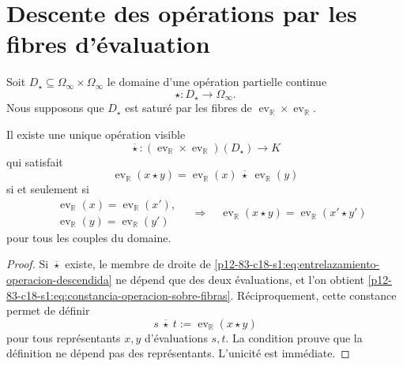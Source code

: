 \section{Descente des opérations par les fibres d'évaluation}

Soit \(D_\star\subseteq\Omega_\infty\times\Omega_\infty\) le domaine d'une
opération partielle continue
\begin{equation}
 \star:D_\star\longrightarrow\Omega_\infty.
 \label{p12-83-c18-s1:eq:operacion-historias-u024}
\end{equation}
Nous supposons que \(D_\star\) est saturé par les fibres de
\(\operatorname{ev}_{\mathbb R}\times\operatorname{ev}_{\mathbb R}\).

\begin{theorem}
\label{p12-83-c18-s1:thm:criterio-descenso-operaciones-u024}
Il existe une unique opération visible
\begin{equation}
 \overline\star:
 (\operatorname{ev}_{\mathbb R}\times\operatorname{ev}_{\mathbb R})
 (D_\star)\longrightarrow K
 \label{p12-83-c18-s1:eq:operacion-descendida-visible}
\end{equation}
qui satisfait
\begin{equation}
 \operatorname{ev}_{\mathbb R}(x\star y)
 =\operatorname{ev}_{\mathbb R}(x)
  \ \overline\star\ 
  \operatorname{ev}_{\mathbb R}(y)
 \label{p12-83-c18-s1:eq:entrelazamiento-operacion-descendida}
\end{equation}
si et seulement si
\begin{equation}
 \begin{split}
 &\operatorname{ev}_{\mathbb R}(x)=
  \operatorname{ev}_{\mathbb R}(x'),\\
 &\operatorname{ev}_{\mathbb R}(y)=
  \operatorname{ev}_{\mathbb R}(y')
 \end{split}
 \quad\Longrightarrow\quad
 \operatorname{ev}_{\mathbb R}(x\star y)=
 \operatorname{ev}_{\mathbb R}(x'\star y')
 \label{p12-83-c18-s1:eq:constancia-operacion-sobre-fibras}
\end{equation}
pour tous les couples du domaine.
\end{theorem}

\begin{proof}
Si \(\overline\star\) existe, le membre de droite de
\eqref{p12-83-c18-s1:eq:entrelazamiento-operacion-descendida} ne dépend que des deux
évaluations, et l'on obtient
\eqref{p12-83-c18-s1:eq:constancia-operacion-sobre-fibras}. Réciproquement, cette
constance permet de définir
\[
 s\ \overline\star\ t
 :=\operatorname{ev}_{\mathbb R}(x\star y)
\]
pour tous représentants \(x,y\) d'évaluations \(s,t\). La
condition prouve que la définition ne dépend pas des représentants.
L'unicité est immédiate.
\end{proof}


